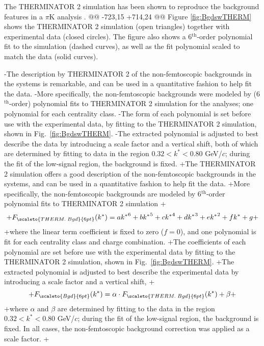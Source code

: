  The THERMINATOR 2 simulation has been shown to reproduce the background features in a $\pi$K analysis \cite{Kisiel:2017}. 
@@ -723,15 +714,24 @@
 Figure \ref{fig:BgdswTHERM} shows the THERMINATOR 2 simulation (open triangles) together with experimental data (closed circles).  
 The figure also shows a 6$^{\mathrm{th}}$-order polynomial fit to the simulation (dashed curves), as well as the fit polynomial scaled to match the data (solid curves).
 
-The description by THERMINATOR 2 of the non-femtoscopic backgrounds in the \LamKpm systems is remarkable, and can be used in a quantitative fashion to help fit the data.
-More specifically, the non-femtoscopic backgrounds were modeled by (6$^{\mathrm{th}}$-order) polynomial fits to THERMINATOR 2 simulation for the \LamKpm analyses; one polynomial for each centrality class.
-The form of each polynomial is set before use with the experimental data, by fitting to the THERMINATOR 2 simulation, shown in Fig.\ \ref{fig:BgdswTHERM}.
-The extracted polynomial is adjusted to best describe the data by introducing a scale factor and a vertical shift, both of which are determined by fitting to data in the region $0.32 < k^{*} < 0.80$ GeV/$c$; during the fit of the low-\kstar signal region, the background is fixed.
+The THERMINATOR 2 simulation offers a good description of the non-femtoscopic backgrounds in the \LamK systems, and can be used in a quantitative fashion to help fit the data.
+More specifically, the non-femtoscopic backgrounds are modeled by 6$^{\mathrm{th}}$-order polynomial fits to THERMINATOR 2 simulation
+\begin{equation}
+F_{\scaleto{THERM.\; Bgd}{6pt}}(k^{*}) = a{k^{*}}^{6}+ b{k^{*}}^{5} + c{k^{*}}^{4} + d{k^{*}}^{3} + e{k^{*}}^{2} + fk^{*} + g
+\end{equation}
+where the linear term coefficient is fixed to zero ($f=0$), and one polynomial is fit for each centrality class and \LamK charge combination.
+The coefficients of each polynomial are set before use with the experimental data by fitting to the THERMINATOR 2 simulation, shown in Fig.\ \ref{fig:BgdswTHERM}.
+The extracted polynomial is adjusted to best describe the experimental data by introducing a scale factor and a vertical shift,
+\begin{equation}
+F_{\scaleto{Bgd}{6pt}}(k^{*}) = \alpha\cdot F_{\scaleto{THERM.\; Bgd}{6pt}}(k^{*}) + \beta
+\end{equation}
+where $\alpha$ and $\beta$ are determined by fitting to the data in the region $0.32 < k^{*} < 0.80$ GeV/$c$; during the fit of the low-\kstar signal region, the background is fixed.
 In all cases, the non-femtoscopic background correction was applied as a scale factor.
+
 

